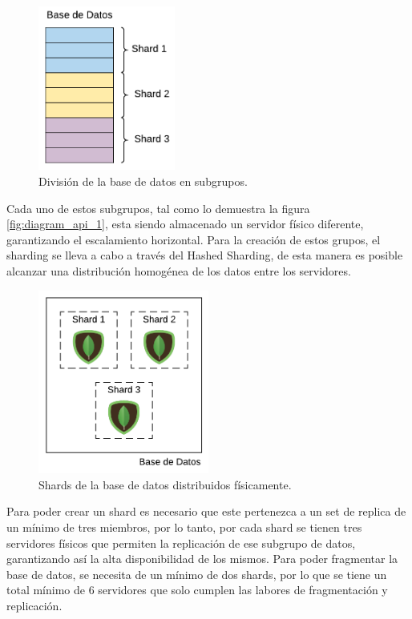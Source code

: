 \begin{figure}[H]
	\centering
		\includegraphics[width=0.4\textwidth]{figures/sharded_database}
	\caption{División de la base de datos en subgrupos.}
	\label{fig:sharded_database}
\end{figure}

Cada uno de estos subgrupos, tal como lo demuestra la figura \ref{fig:diagram_api_1}, esta siendo almacenado un servidor físico diferente, garantizando el escalamiento horizontal.
Para la creación de estos grupos, el sharding se lleva a cabo a través del Hashed Sharding, de esta manera es
posible alcanzar una distribución homogénea de los datos entre los servidores.

\begin{figure}[H]
	\centering
		\includegraphics[width=0.5\textwidth]{figures/shards_distributed}
	\caption{Shards de la base de datos distribuidos físicamente.}
	\label{fig:shards_distributed}
\end{figure}

Para poder crear un shard es necesario que este pertenezca a un set de replica de un mínimo de tres miembros,
por lo tanto, por cada shard se tienen tres servidores físicos que permiten la replicación de ese subgrupo de datos, garantizando
así la alta disponibilidad de los mismos.
Para poder fragmentar la base de datos, se necesita de un mínimo de dos shards, por lo que se tiene un total mínimo de 6 servidores
que solo cumplen las labores de fragmentación y replicación.

